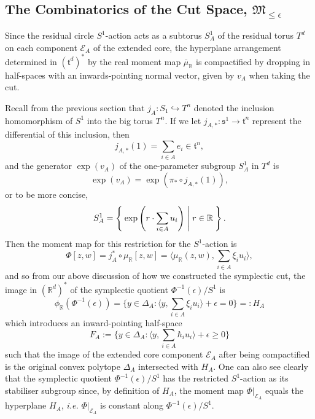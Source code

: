 \documentclass{article}
\newcommand{\st}{\ensuremath{:}}%
\newcommand{\ie}{\emph{i.e.} }
\newcommand{\lbracket}{\left(}
\newcommand{\rbracket}{\right)}
\newcommand{\e}{\epsilon}
\newcommand{\RR}{\mathbb{R}}
\newcommand{\mft}{\mathfrak{t}}
\newcommand{\mc}[1]{\mathcal{#1}}
\newcommand{\mf}[1]{\mathfrak{#1}}
\newcommand{\mrr}{\mu_{\mathbb{R}}}
\newcommand{\prr}{\phi_{\mathbb{R}}}
\begin{document}
	\subsection{The Combinatorics of the Cut Space, $\mf{M}_{\leq \e}$}
	
	Since the residual circle $S^{1}$-action acts as a subtorus $S_{A}^{1}$ of the residual torus $T^{d}$ on each component $\mc{E}_{A}$ of the extended core, the hyperplane arrangement determined in $(\mft^{d})^{\ast}$ by the real moment map $\bar{\mu}_{\RR}$ is compactified by dropping in half-spaces with an inwards-pointing normal vector, given by $v_{A}$ when taking the cut. 
	
	Recall from the previous section that $j_{A}: S_{1} \hookrightarrow T^{n}$ denoted the inclusion homomorphism of $S^{1}$ into the big torus $T^{n}$. If we let $j_{A, \ast}: \mf{s}^{1} \rightarrow \mft^{n}$ represent the differential of this inclusion, then
	\[
		j_{A,\ast}(1) = \sum_{i \in A} e_{i} \in \mft^{n},
	\]
	and the generator $\exp(v_{A})$ of the one-parameter subgroup $S_{A}^{1}$ in $T^{d}$ is
	\[
		\exp(v_{A}) = \exp\lbracket \pi_{\ast} \circ j_{A, \ast}(1) \rbracket,
	\]
	or to be more concise,
	\[
		S_{A}^{1} = \Set{ \exp \lbracket r \cdot \sum_{i \in A} u_{i} \rbracket | r \in \RR }.
	\]
	Then the moment map for this restriction for the $S^{1}$-action is
	\begin{equation*}
		\Phi[z,w] = j_{A}^{\ast} \circ \mrr[z,w] = \bigg\langle \mrr(z,w), \sum_{i\in A}\xi_{i} u_{i} \bigg\rangle,
	\end{equation*}
	and so from our above discussion of how we constructed the symplectic cut, the image in $(\RR^{d})^{\ast}$ of the symplectic quotient $\Phi^{-1}(\e)/S^{1}$ is
	\begin{equation*}
		\prr(\Phi^{-1}(\e)) = \bigg\{ y \in \Delta_{A} \st \bigg\langle y, \sum_{i\in A}\xi_{i}u_{i}\bigg\rangle + \e = 0 \bigg\} =: H_{A}
	\end{equation*}
	which introduces an inward-pointing half-space
	\begin{equation*}
		F_{A} := \bigg\{ y \in \Delta_{A} \st \bigg\langle y, \sum_{i\in A}\hbar_{i}u_{i}\bigg\rangle + \e \geq 0 \bigg\}
	\end{equation*}
	such that the image of the extended core component $\mc{E}_{A}$ after being compactified is the original convex polytope $\Delta_{A}$ intersected with $H_{A}$. One can also see clearly that the symplectic quotient $\Phi^{-1}(\e)/S^{1}$ has the restricted $S^{1}$-action as its stabiliser subgroup since, by definition of $H_{A}$, the moment map $\Phi|_{\mc{E}_{A}}$ equals the hyperplane $H_{A}$, \ie $\Phi|_{\mc{E}_{A}}$ is constant along $\Phi^{-1}(\epsilon)/S^{1}$.
	
\end{document}
